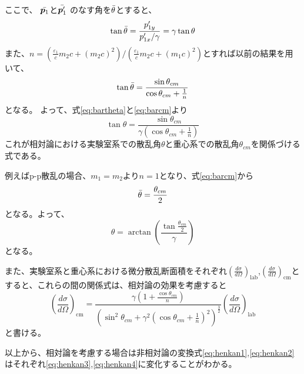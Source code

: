 \documentclass[a4paper,11pt,dvipdfmx]{jsarticle}
\begin{document}
ここで、 $\Bar{\bm{p}_{1}}$と$\Bar{\bm{p}'_{1}}$ のなす角を$\Bar{\theta}$とすると、
\begin{equation}
    \tan\Bar{\theta}=\frac{p'_{1y}}{p'_{1x}/\gamma}=\gamma\tan\theta \label{eq:bartheta}
\end{equation}
また、$n=\left(\frac{\varepsilon_{1}}{c}m_{2}c + (m_{2}c)^2\right)/\left(\frac{\varepsilon_{1}}{c}m_{2}c + (m_{1}c)^2\right)$とすれば以前の結果を用いて、
\begin{equation}
    \tan\Bar{\theta} = \frac{\sin\theta_{cm}}{\cos\theta_{cm}+\frac{1}{n}} \label{eq:barcm}
\end{equation}
となる。
よって、式\eqref{eq:bartheta}と\eqref{eq:barcm}より
\begin{equation}
    \tan\theta = \frac{\sin\theta_{cm}}{\gamma\left(\cos\theta_{cm}+\frac{1}{n}\right)} \label{eq:henkan3}
\end{equation}
これが相対論における実験室系での散乱角$\theta$と重心系での散乱角$\theta_{cm}$を関係づける式である。

例えばp-p散乱の場合、$m_{1}=m_{2}$より$n=1$となり、式\eqref{eq:barcm}から
\begin{equation}
    \Bar{\theta}=\frac{\theta_{cm}}{2}
\end{equation}
となる。よって、
\begin{equation}
    \theta=\arctan\left(\frac{\tan\frac{\theta_{cm}}{2}}{\gamma}\right)
\end{equation}
となる。

また、実験室系と重心系における微分散乱断面積をそれぞれ$\left(\frac{d\sigma}{d\Omega}\right)_\text{lab}$,$\left(\frac{d\sigma}{d\Omega}\right)_\text{cm}$とすると、これらの間の関係式は、相対論の効果を考慮すると
\begin{equation}
    \left(\frac{d\sigma}{d\Omega}\right)_\text{cm} = \frac{\gamma\left(1+\frac{\cos\theta_{cm}}{n}\right)}{\left(\sin^2\theta_{cm}+\gamma^2\left(\cos\theta_{cm}+\frac{1}{n}\right)^2\right)^{\frac{3}{2}}}\left(\frac{d\sigma}{d\Omega}\right)_\text{lab}\label{eq:henkan4}
\end{equation}
と書ける。

以上から、相対論を考慮する場合は非相対論の変換式\eqref{eq:henkan1},\eqref{eq:henkan2}はそれぞれ\eqref{eq:henkan3},\eqref{eq:henkan4}に変化することがわかる。
\end{document}
